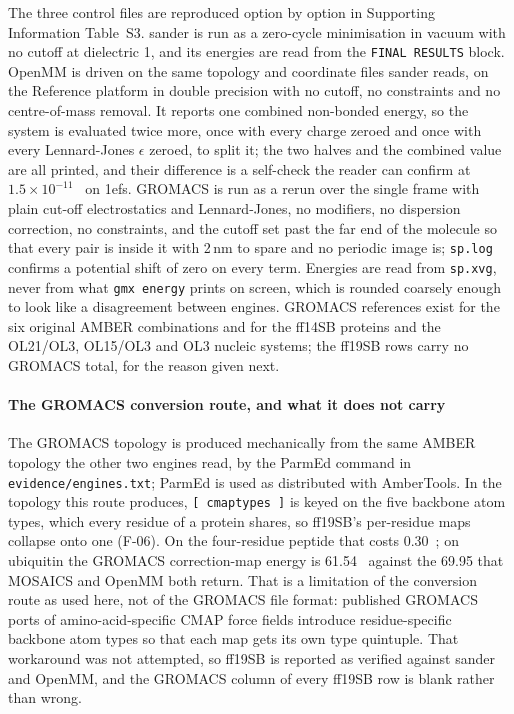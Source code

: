 The three control files are reproduced option by option in Supporting
Information Table~S3. sander is run as a zero-cycle minimisation in vacuum with
no cutoff at dielectric 1, and its energies are read from the \texttt{FINAL
RESULTS} block. OpenMM is driven on the same topology and coordinate files
sander reads, on the Reference platform in double precision with no cutoff, no
constraints and no centre-of-mass removal. It reports one combined non-bonded
energy, so the system is evaluated twice more, once with every charge zeroed
and once with every Lennard-Jones $\epsilon$ zeroed, to split it; the two
halves and the combined value are all printed, and their difference is a
self-check the reader can confirm at $1.5\times10^{-11}$~\kcal{} on 1efs.
GROMACS is run as a rerun over the single frame with plain cut-off
electrostatics and Lennard-Jones, no modifiers, no dispersion correction, no
constraints, and the cutoff set past the far end of the molecule so that every
pair is inside it with 2\,nm to spare and no periodic image is; \texttt{sp.log}
confirms a potential shift of zero on every term. Energies are read from
\texttt{sp.xvg}, never from what \texttt{gmx energy} prints on screen, which is
rounded coarsely enough to look like a disagreement between engines. GROMACS
references exist for the six original AMBER combinations and for the ff14SB
proteins and the OL21/OL3, OL15/OL3 and OL3 nucleic systems; the ff19SB rows
carry no GROMACS total, for the reason given next.

\paragraph{The GROMACS conversion route, and what it does not carry}
The GROMACS topology is produced mechanically from the same AMBER topology the
other two engines read, by the ParmEd command in \texttt{evidence/engines.txt};
ParmEd is used as distributed with AmberTools\cite{case2023ambertools}. In the
topology this route produces, \texttt{[ cmaptypes ]} is keyed on the five
backbone atom types, which every residue of a protein shares, so ff19SB's
per-residue maps collapse onto one (F-06). On the four-residue peptide that
costs 0.30~\kcal{}; on ubiquitin the GROMACS correction-map energy is
61.54~\kcal{} against the 69.95 that MOSAICS and OpenMM both return. That is a
limitation of the conversion route as used here, not of the GROMACS file
format: published GROMACS ports of amino-acid-specific CMAP force fields
introduce residue-specific backbone atom types so that each map gets its own
type quintuple. That workaround was not attempted, so ff19SB is reported as
verified against sander and OpenMM, and the GROMACS column of every ff19SB row
is blank rather than wrong.

